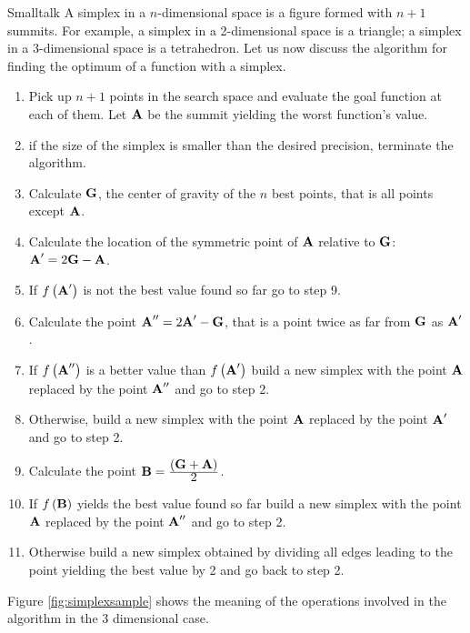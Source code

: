 \begin{displaycode}{Smalltalk}
A simplex in a $n$-dimensional space is a figure formed with $n+1$
summits. For example, a simplex in a 2-dimensional space is a
triangle; a simplex in a 3-dimensional space is a tetrahedron.
Let us now discuss the algorithm for finding the optimum of a
function with a simplex.
\begin{enumerate}
  \item Pick up $n+1$ points in the search space and evaluate
  the goal function at each of them. Let ${\textbf A}$ be the summit
  yielding the worst function's value.
  \item if the size of the simplex is smaller than the desired
  precision, terminate the algorithm.
  \item Calculate ${\textbf G}$, the center of gravity of the $n$ best points,
  that is all points except ${\textbf A}$.
  \item Calculate the location of the symmetric point of ${\textbf A}$
  relative to ${\textbf G}$: ${\textbf A}^{\prime}=2{\textbf G}-{\textbf A}$.
  \item If $f\left({\textbf A}^{\prime}\right)$ is not the best value
  found so far go to step 9.
  \item Calculate the point ${\textbf A}^{\prime\prime}=2{\textbf A}^{\prime}-{\textbf
  G}$, that is a point twice as far from ${\textbf G}$ as ${\textbf
  A}^{\prime}$.
  \item If $f\left({\textbf A}^{\prime\prime}\right)$ is a
  better value than $f\left({\textbf A}^{\prime}\right)$ build a new
  simplex with the point ${\textbf A}$ replaced by the point ${\textbf
  A}^{\prime\prime}$ and go to step 2.
  \item Otherwise, build a new
  simplex with the point ${\textbf A}$ replaced by the point ${\textbf
  A}^{\prime}$ and go to step 2.
  \item Calculate the point ${\textbf B}= {\displaystyle\left({\textbf G}+{\textbf
A}\right)\over\displaystyle 2}$.
  \item If $f\left({\textbf B}\right)$ yields the best value found so far
  build a new simplex with the point ${\textbf A}$ replaced by the point ${\textbf
  A}^{\prime\prime}$ and go to step 2.
  \item Otherwise build a new simplex obtained by dividing all
  edges leading to the point yielding the best value by 2 and go
  back to step 2.
\end{enumerate}
Figure \ref{fig:simplexsample} shows the meaning of the operations
involved in the algorithm in the 3 dimensional case.
\begin{figure}

\end{figure}
\end{displaycode}
